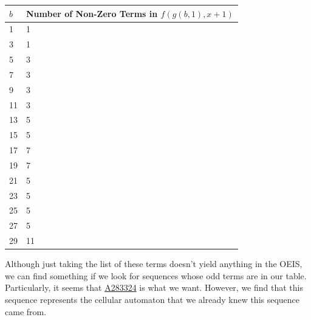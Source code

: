 \documentclass{article}
\begin{document}
	\begin{table}[H]
		\centering
		\begin{tabular}{|l||l|}
			\hline
			$b$ & Number of Non-Zero Terms in $f(g(b,1),x+1)$ \\
			\hline\hline
			1 & 1 \\
			\hline
			3 & 1 \\
			\hline
			5 & 3 \\
			\hline
			7 & 3 \\
			\hline
			9 & 3 \\
			\hline
			11 & 3 \\
			\hline
			13 & 5 \\
			\hline
			15 & 5 \\
			\hline
			17 & 7 \\
			\hline
			19 & 7 \\
			\hline
			21 & 5 \\
			\hline
			23 & 5 \\
			\hline
			25 & 5 \\
			\hline
			27 & 5 \\
			\hline
			29 & 11 \\
			\hline
		\end{tabular}
	\end{table}
	Although just taking the list of these terms doesn't yield anything in the OEIS, we can find something if we look for sequences whose odd terms are in our table.
	Particularly, it seems that \href{https://oeis.org/A283324}{A283324} is what we want.
	However, we find that this sequence represents the cellular automaton that we already knew this sequence came from.
\end{document}
